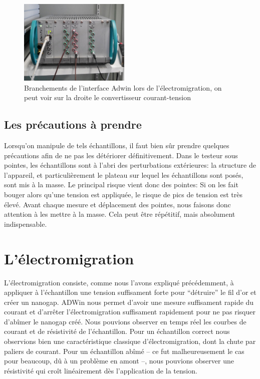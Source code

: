 \begin{figure}[h]
    \begin{center}
        \includegraphics[width=200px]{Images/3_Branchements_ADWin.jpg}
        \caption{Branchements de l'interface Adwin lors de l'électromigration, on peut voir sur la droite le convertisseur courant-tension}
    \end{center}
\end{figure}


\subsection{Les précautions à prendre}
Lorsqu'on manipule de tels échantillons, il faut bien sûr prendre quelques précautions afin de ne pas les détériorer définitivement.
Dans le testeur sous pointes, les échantillons sont à l'abri des perturbations extérieures: la structure de l'appareil, et particulièrement le plateau sur lequel les échantillons sont posés, sont mis à la masse.
Le principal risque vient donc des pointes: Si on les fait bouger alors qu'une tension est appliquée, le risque de pics de tension est très élevé. Avant chaque mesure et déplacement des pointes, nous faisons donc attention à les mettre à la masse. Cela peut être répétitif, mais absolument indispensable. 

\section{L'électromigration}
L'électromigration consiste, comme nous l'avons expliqué précédemment, à appliquer à l'échantillon une tension suffisament forte pour “détruire” le fil d'or et créer un nanogap.
ADWin nous permet d'avoir une mesure suffisament rapide du courant et d'arrêter l'électromigration suffisament rapidement pour ne pas risquer d'abîmer le nanogap créé.
Nous pouvions observer en temps réel les courbes de courant et de résistivité de l'échantillon. Pour un échantillon correct nous observions bien une caractéristique classique d'électromigration, dont la chute par paliers de courant.
Pour un échantillon abîmé -- ce fut malheureusement le cas pour beaucoup, dû à un problème en amont --, nous pouvions observer une résistivité qui croît linéairement dès l'application de la tension.


